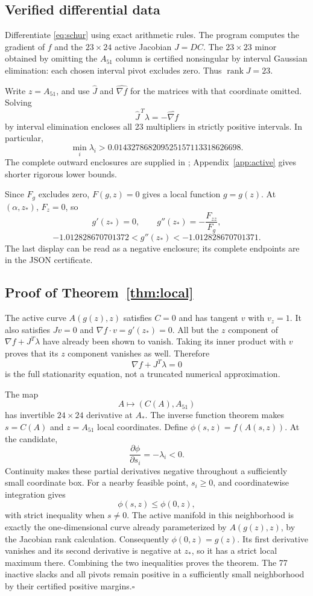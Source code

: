 \documentclass[11pt,letterpaper]{article}
\newcommand{\code}[1]{\texttt{\detokenize{#1}}}
\begin{document}
\subsection{Verified differential data}
Differentiate \eqref{eq:schur} using exact arithmetic rules. The program computes the gradient of $f$ and the $23\times24$ active Jacobian $J=DC$. The $23\times23$ minor obtained by omitting the $A_{51}$ column is certified nonsingular by interval Gaussian elimination: each chosen interval pivot excludes zero. Thus $\operatorname{rank}J=23$.

Write $z=A_{51}$, and use $\widehat J$ and $\widehat{\nabla f}$ for the matrices with that coordinate omitted. Solving
\[
                 \widehat J^{\,T}\lambda=-\widehat{\nabla f}
\]
by interval elimination encloses all 23 multipliers in strictly positive intervals. In particular,
\[
              \min_i\lambda_i>
                  0.014327868209525157113318626698.
\]
The complete outward enclosures are supplied in \code{results/local_certificate.json}; Appendix~\ref{app:active} gives shorter rigorous lower bounds.

Since $F_g$ excludes zero, $F(g,z)=0$ gives a local function $g=g(z)$. At $(\alpha,z_*)$, $F_z=0$, so
\[
 g'(z_*)=0,\qquad g''(z_*)=-\frac{F_{zz}}{F_g},
\]
\[
 -1.012828670701372<g''(z_*)<-1.012828670701371.
\]
The last display can be read as a negative enclosure; its complete endpoints are in the JSON certificate.

\subsection{Proof of Theorem~\ref{thm:local}}
The active curve $A(g(z),z)$ satisfies $C=0$ and has tangent $v$ with $v_z=1$. It also satisfies $Jv=0$ and $\nabla f\cdot v=g'(z_*)=0$. All but the $z$ component of $\nabla f+J^T\lambda$ have already been shown to vanish. Taking its inner product with $v$ proves that its $z$ component vanishes as well. Therefore
\[
                    \nabla f+J^T\lambda=0
\]
is the full stationarity equation, not a truncated numerical approximation.

The map
\[
                    A\longmapsto (C(A),A_{51})
\]
has invertible $24\times24$ derivative at $A_*$. The inverse function theorem makes $s=C(A)$ and $z=A_{51}$ local coordinates. Define $\phi(s,z)=f(A(s,z))$. At the candidate,
\[
                  \frac{\partial\phi}{\partial s_i}=-\lambda_i<0.
\]
Continuity makes these partial derivatives negative throughout a sufficiently small coordinate box. For a nearby feasible point, $s_i\ge0$, and coordinatewise integration gives
\[
                     \phi(s,z)\le\phi(0,z),
\]
with strict inequality when $s\ne0$. The active manifold in this neighborhood is exactly the one-dimensional curve already parameterized by $A(g(z),z)$, by the Jacobian rank calculation. Consequently $\phi(0,z)=g(z)$. Its first derivative vanishes and its second derivative is negative at $z_*$, so it has a strict local maximum there. Combining the two inequalities proves the theorem. The 77 inactive slacks and all pivots remain positive in a sufficiently small neighborhood by their certified positive margins.\hfill$\square$
\end{document}
